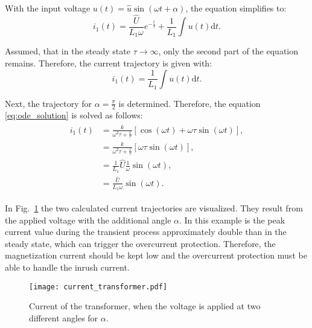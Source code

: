 \begin{solutionblock}
  With the input voltage $u(t) = \hat{u}\sin(\omega t + \alpha)$, the equation simplifies to:
  \begin{equation}
    i_{\mathrm{1}}(t) = \frac{\hat{U}}{L_{\mathrm{1}}\omega}e^{-\frac{t}{\tau}} + \frac{1}{L_{\mathrm{1}}} \int u(t) \mathrm{d}t.
  \end{equation}

  Assumed, that in the steady state $\tau \rightarrow \infty$, only the second part of the equation remains. Therefore, the current trajectory is given with:
  \begin{equation}
    i_{\mathrm{1}}(t) = \frac{1}{L_{\mathrm{1}}} \int u(t) \mathrm{d}t.
  \end{equation}

  Next, the trajectory for $\alpha = \frac{\pi}{2}$ is determined. Therefore, the equation \eqref{eq:ode_solution} is solved as follows:
  \begin{align}
    \begin{split}
      i_{\mathrm{1}}(t) &= \frac{k}{\omega^2\tau + \frac{1}{\tau}}
      \left[\cos(\omega t) + \omega \tau \sin(\omega t) \right], \\
      &= \frac{k}{\omega^2\tau + \frac{1}{\tau}} \left[\omega \tau \sin(\omega t) \right], \\
      &= \frac{1}{L_{\mathrm{1}}} \hat{U} \frac{1}{\omega} \sin(\omega t), \\
      &= \frac{\hat{U}}{L_{\mathrm{1}}\omega} \sin(\omega t).
    \end{split}
  \end{align}


  In Fig.~\ref{fig:current_transformer} the two calculated current trajectories are visualized. They result from the applied voltage with the additional angle $\alpha$.
  In this example is the peak current value during the transient process approximately double than in the steady state, which can trigger the overcurrent protection. Therefore, the magnetization current should be kept low and the overcurrent protection must be able to handle the inrush current.
  \begin{figure}[htb]
    \centering
    \texttt{[image: current\_transformer.pdf]}
    \caption{Current of the transformer, when the voltage is applied at two different angles for $\alpha$.}
    \label{fig:current_transformer}
  \end{figure}
  

\end{solutionblock}